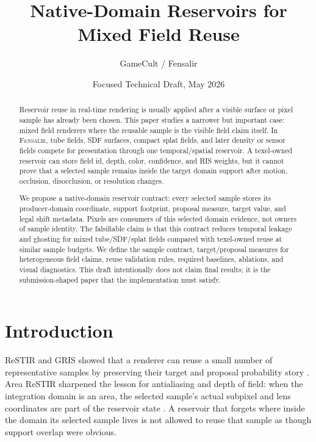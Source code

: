 \documentclass[11pt]{article}
\title{Native-Domain Reservoirs for Mixed Field Reuse}
\author{GameCult / Fensalir}
\date{Focused Technical Draft, May 2026}
\newcommand{\Fensalir}{\textsc{Fensalir}}
\newcommand{\ReSTIR}{ReSTIR}
\newcommand{\AreaReSTIR}{Area ReSTIR}
\newcommand{\GRIS}{GRIS}
\begin{document}
\maketitle

\begin{abstract}
Reservoir reuse in real-time rendering is usually applied after a visible
surface or pixel sample has already been chosen.  This paper studies a narrower
but important case: mixed field renderers where the reusable sample is the
visible field claim itself.  In \Fensalir, tube fields, SDF surfaces, compact
splat fields, and later density or sensor fields compete for presentation
through one temporal/spatial reservoir.  A texel-owned reservoir can store
field id, depth, color, confidence, and RIS weights, but it cannot prove that a
selected sample remains inside the target domain support after motion,
occlusion, disocclusion, or resolution changes.

We propose a native-domain reservoir contract: every selected sample stores its
producer-domain coordinate, support footprint, proposal measure, target value,
and legal shift metadata.  Pixels are consumers of this selected domain
evidence, not owners of sample identity.  The falsifiable claim is that this
contract reduces temporal leakage and ghosting for mixed tube/SDF/splat fields
compared with texel-owned reuse at similar sample budgets.  We define the
sample contract, target/proposal measures for heterogeneous field claims, reuse
validation rules, required baselines, ablations, and visual diagnostics.  This
draft intentionally does not claim final results; it is the submission-shaped
paper that the implementation must satisfy.
\end{abstract}

\section{Introduction}

\ReSTIR{} and \GRIS{} showed that a renderer can reuse a small number of
representative samples by preserving their target and proposal probability
story \cite{bitterli2020restir,lin2022gris}.  \AreaReSTIR{} sharpened the
lesson for antialiasing and depth of field: when the integration domain is an
area, the selected sample's actual subpixel and lens coordinates are part of
the reservoir state \cite{zhang2024arearestir}.  A reservoir that forgets where
inside the domain its selected sample lives is not allowed to reuse that sample
as though support overlap were obvious.
\end{document}
